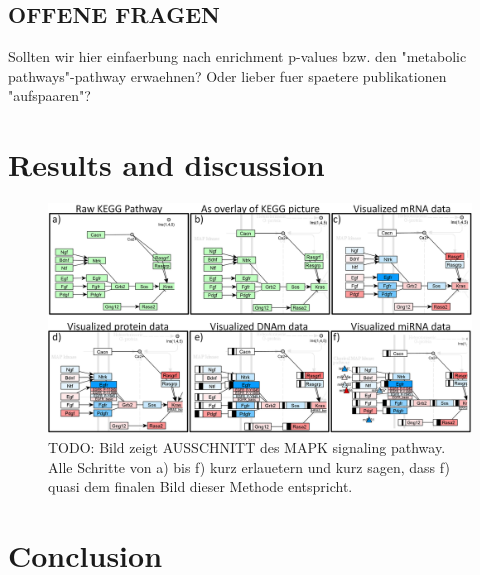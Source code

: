 \documentclass{bioinfo}
\begin{document}
\subsection{OFFENE FRAGEN}

Sollten wir hier einfaerbung nach enrichment p-values bzw. den "metabolic
pathways"-pathway erwaehnen? Oder lieber fuer spaetere publikationen "aufspaaren"?




\section{Results and discussion}


\begin{figure}[t]
\centering
\includegraphics[width=1.0\textwidth]{figures/visualization-steps.png}
\caption{
TODO: Bild zeigt AUSSCHNITT des MAPK signaling pathway. Alle Schritte von a) bis f) kurz erlauetern und kurz sagen, dass f) quasi dem finalen Bild dieser Methode entspricht. }\label{fig:visualization_steps}
\end{figure}




\section{Conclusion}
\end{document}

